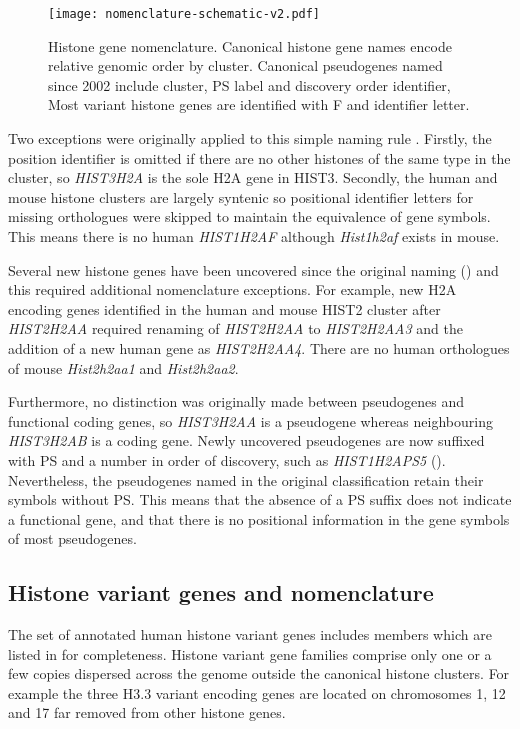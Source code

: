 \begin{figure*}[hp]
	\centering
	\texttt{[image: nomenclature-schematic-v2.pdf]}
	\caption{Histone gene nomenclature. 
	Canonical histone gene names encode relative genomic order by cluster.
	Canonical pseudogenes named since 2002 include cluster, PS label and discovery order identifier,
	Most variant histone genes are identified with F and identifier letter.}
	\label{fig:nomenclature}
\end{figure*}

	Two exceptions were originally applied to this simple naming rule \citep{Marzluff02}. 
	Firstly, the position identifier is omitted if there are no other histones of the same type in the cluster, 
	so \textit{HIST3H2A} is the sole H2A gene in HIST3. 
	Secondly, the human and mouse histone clusters are largely syntenic 
	so positional identifier letters for missing orthologues were skipped to maintain the equivalence of gene symbols.
	This means there is no human \textit{HIST1H2AF} although \textit{Hist1h2af} exists in mouse.

	Several new histone genes have been uncovered since the original naming () 
	and this required additional nomenclature exceptions.
	For example, new H2A encoding genes identified in the human and mouse HIST2 cluster after \textit{HIST2H2AA} 
	required renaming of \textit{HIST2H2AA} to \textit{HIST2H2AA3} 
	and the addition of a new human gene as \textit{HIST2H2AA4}. 
	There are no human orthologues of mouse \textit{Hist2h2aa1} and \textit{Hist2h2aa2}.

	Furthermore, no distinction was originally made between pseudogenes and functional coding genes,
	so \textit{HIST3H2AA} is a pseudogene whereas neighbouring \textit{HIST3H2AB} is a coding gene.
	Newly uncovered pseudogenes are now suffixed with PS and a number in order of discovery,
	such as \textit{HIST1H2APS5} (). 
	Nevertheless, the pseudogenes named in the original classification retain their symbols without PS.
	This means that the absence of a PS suffix does not indicate a functional gene, 
	and that there is no positional information in the gene symbols of most pseudogenes.

\subsection{Histone variant genes and nomenclature}
	The set of annotated human histone variant genes 
	includes  members 
	which are listed in  for completeness.
	Histone variant gene families comprise only one or a few copies 
	dispersed across the genome outside the canonical histone clusters.
	For example the three H3.3 variant encoding genes are located 
	on chromosomes 1, 12 and 17 far removed from other histone genes.

